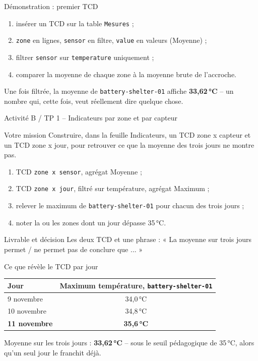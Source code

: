 \documentclass[aspectratio=169]{beamer}
\begin{document}
\begin{frame}{Démonstration : premier TCD}
  \begin{enumerate}
    \item insérer un TCD sur la table \texttt{Mesures} ;
    \item \texttt{zone} en lignes, \texttt{sensor} en filtre, \texttt{value} en valeurs (Moyenne) ;
    \item filtrer \texttt{sensor} sur \texttt{temperature} uniquement ;
    \item comparer la moyenne de chaque zone à la moyenne brute de l'accroche.
  \end{enumerate}
  \normalsize Une fois filtrée, la moyenne de \texttt{battery-shelter-01} affiche \textbf{33,62\,°C} -- un nombre qui, cette fois, veut réellement dire quelque chose.
\end{frame}

\begin{frame}{Activité B / TP 1 -- Indicateurs par zone et par capteur}
  \begin{block}{Votre mission}
    Construire, dans la feuille Indicateurs, un TCD zone x capteur et un TCD zone x jour, pour retrouver ce que la moyenne des trois jours ne montre pas.
  \end{block}
  \begin{enumerate}
    \item TCD \texttt{zone x sensor}, agrégat Moyenne ;
    \item TCD \texttt{zone x jour}, filtré sur température, agrégat Maximum ;
    \item relever le maximum de \texttt{battery-shelter-01} pour chacun des trois jours ;
    \item noter la ou les zones dont un jour dépasse 35\,°C.
  \end{enumerate}
  \begin{block}{Livrable et décision}
    Les deux TCD et une phrase : « La moyenne sur trois jours permet / ne permet pas de conclure que ... »
  \end{block}
\end{frame}

\begin{frame}{Ce que révèle le TCD par jour}
  \small
  \begin{center}
  \begin{tabular}{@{}lc@{}}
    \toprule
    Jour & Maximum température, \texttt{battery-shelter-01} \\
    \midrule
    9 novembre & 34,0\,°C \\
    10 novembre & 34,8\,°C \\
    \textbf{11 novembre} & \textbf{35,6\,°C} \\
    \bottomrule
  \end{tabular}
  \end{center}
  \vfill
  \normalsize Moyenne sur les trois jours : \textbf{33,62\,°C} -- sous le seuil pédagogique de 35\,°C, alors qu'un seul jour le franchit déjà.
\end{frame}
\end{document}

